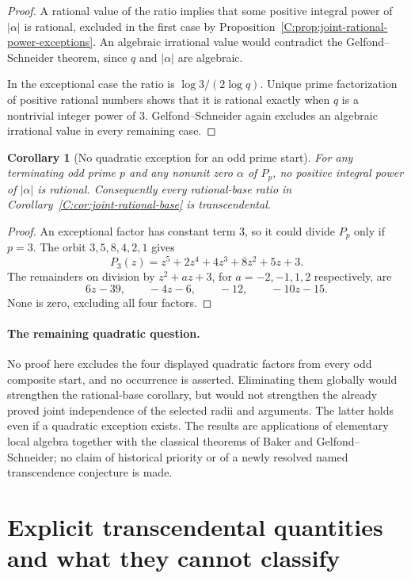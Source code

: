 \documentclass[11pt,a4paper]{article}
\newtheorem{corollary}[theorem]{Corollary}
\theoremstyle{definition}
\theoremstyle{remark}
\numberwithin{equation}{section}
\begin{document}
\begin{proof}
A rational value of the ratio implies that some positive integral
power of $|\alpha|$ is rational, excluded in the first case by
Proposition~\ref{C:prop:joint-rational-power-exceptions}.
An algebraic irrational value would contradict the
Gelfond--Schneider theorem, since $q$ and $|\alpha|$ are algebraic.

In the exceptional case the ratio is
$\log3/(2\log q)$.
Unique prime factorization of positive rational numbers shows that
it is rational exactly when $q$ is a nontrivial integer power of
$3$.  Gelfond--Schneider again excludes an algebraic irrational
value in every remaining case.
\end{proof}

\begin{corollary}[No quadratic exception for an odd prime start]
\label{C:cor:joint-prime-no-exceptions}
For any terminating odd prime $p$ and any nonunit zero $\alpha$
of $P_p$, no positive integral power of $|\alpha|$ is rational.
Consequently every rational-base ratio in
Corollary~\ref{C:cor:joint-rational-base} is transcendental.
\end{corollary}

\begin{proof}
An exceptional factor has constant term $3$, so it could divide
$P_p$ only if $p=3$.
The orbit $3,5,8,4,2,1$ gives
\[
 P_3(z)=z^5+2z^4+4z^3+8z^2+5z+3.
\]
The remainders on division by $z^2+az+3$, for
$a=-2,-1,1,2$ respectively, are
\[
 6z-39,\qquad -4z-6,\qquad -12,\qquad -10z-15.
\]
None is zero, excluding all four factors.
\end{proof}

\paragraph{The remaining quadratic question.}
No proof here excludes the four displayed quadratic factors from
every odd composite start, and no occurrence is asserted.
Eliminating them globally would strengthen the rational-base
corollary, but would not strengthen the already proved joint
independence of the selected radii and arguments.
The latter holds even if a quadratic exception exists.
The results are applications of elementary local algebra together
with the classical theorems of Baker and Gelfond--Schneider;
no claim of historical priority or of a newly resolved named
transcendence conjecture is made.


\section{Explicit transcendental quantities and what they cannot classify}
\label{C:sec:explicit-transcendental}
\end{document}
